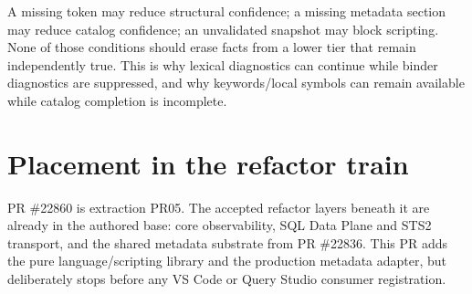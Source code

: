 \documentclass[11pt]{article}
\begin{document}
\begin{designbox}[title={The central safety invariant}]
A missing token may reduce structural confidence; a missing metadata section may reduce catalog confidence; an unvalidated snapshot may block scripting. None of those conditions should erase facts from a lower tier that remain independently true. This is why lexical diagnostics can continue while binder diagnostics are suppressed, and why keywords/local symbols can remain available while catalog completion is incomplete.
\end{designbox}

\section{Placement in the refactor train}

PR \#22860 is extraction PR05. The accepted refactor layers beneath it are already in the authored base: core observability, SQL Data Plane and STS2 transport, and the shared metadata substrate from PR \#22836. This PR adds the pure language/scripting library and the production metadata adapter, but deliberately stops before any VS Code or Query Studio consumer registration.
\end{document}

